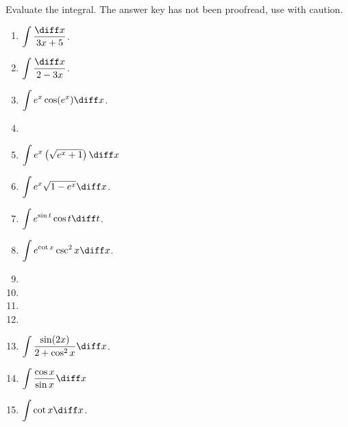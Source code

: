 Evaluate the integral. The answer key has not been proofread, use with caution.
\begin{multicols}{3}
\begin{enumerate}[ref={\fcProblemRef}]
\item $\displaystyle\int \frac{\diff x}{3x+5} $.


\item $\displaystyle\int \frac{\diff x}{2-3x}$.

\item $\displaystyle\int e^x\cos (e^x) \diff x$.

\item 
\item \label{probleminte^x(sqrt(e^x+1))dx} ${\displaystyle \int e^x \left(\sqrt{e^x + 1}\right) \diff x}$

\item $\displaystyle\int e^x\sqrt{1-e^x} \diff x$.

\item $\displaystyle\int e^{\sin t }\cos t \diff t$.

\item $\displaystyle\int e^{\cot x}\csc^2x \diff x$.

\item 
\item 
\item 
\item 
\item \label{problemintsin(2x)/(2+cos^2x)dx} $\displaystyle\int \frac{\sin (2x)}{2+\cos^2x}\diff x$.

\item ${\displaystyle \int \frac{\cos x}{\sin x} \diff x}$

\item $\displaystyle\int \cot x \diff x$.


\end{enumerate}
\end{multicols}
